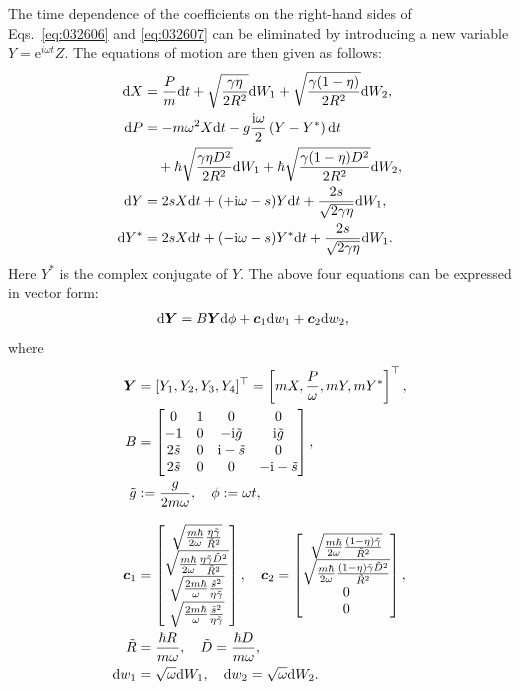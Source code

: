 \documentclass[aps,pra,superscriptaddress,twocolumn
]{revtex4-2}
\newcommand{\e}{\mathrm{e}}
\renewcommand{\i}{\mathrm{i}}
\renewcommand{\d}{{\rm d}}
\begin{document}
 
 The time dependence of the coefficients on the right-hand sides of 
 Eqs.~\eqref{eq:032606} and \eqref{eq:032607} can be eliminated 
 by introducing a new variable $Y=\e^{i\omega t} Z$.
 The equations of motion are then given as follows:
 \begin{alignat}{1}
  \d X &= \frac{P}{m}\d t + \sqrt{\frac{\gamma\eta}{2R^2}}\d W_1 
  + \sqrt{\frac{\gamma(1-\eta)}{2R^2}} \d W_2, \\
  \d P &= - m\omega^2 X\d t -g\frac{\i\omega}{2}\left(Y - Y^*\right) \d t \notag \\
  &\quad + \hbar \sqrt{\frac{\gamma\eta D^2}{2R^2}}\d W_1 
  + \hbar \sqrt{\frac{\gamma(1-\eta)D^2}{2R^2}}\d W_2,  \\
  \d Y &= 2s X \d t + (+\i\omega -s) Y \d t 
  + \frac{2s}{\sqrt{2\gamma\eta}}\d W_1, \\
  \d Y^* &= 2s X \d t + (-\i\omega -s) Y^* \d t 
  + \frac{2s}{\sqrt{2\gamma\eta}}\d W_1.
 \end{alignat}
 Here $Y^*$ is the complex conjugate of $Y$.
 The above four equations can be expressed in vector form:
 \begin{alignat}{1}
  \d \bm Y &= B \bm Y \d \phi + \bm c_1 \d w_1 + \bm c_2 \d w_2, \label{eq011902}
 \end{alignat}
 where
  \begin{alignat}{1}
  \bm Y &= [Y_1,Y_2,Y_3,Y_4]^\top = \left[mX, \frac{P}{\omega}, mY, mY^*\right]^\top,  \\
  B &= \begin{bmatrix}
       0 & 1 & 0 & 0 \\
  -1 & 0 & -\i \tilde g & \i \tilde g \\
       2\tilde s& 0 & \i -\tilde s & 0 \\
       2\tilde s & 0 & 0 & -\i -\tilde s
   \end{bmatrix}, \\
  \tilde g &:= \frac{g}{2m\omega}, \quad 
   \phi := \omega t,\\[3mm]
  \bm c_1 &= 
   \begin{bmatrix}
  \sqrt{\frac{m\hbar}{2\omega} \frac{\eta \tilde\gamma}{\tilde R^2}} \\
  \sqrt{\frac{m\hbar}{2\omega} \frac{\eta \tilde\gamma \tilde D^2}{\tilde R^2}} \\
  \sqrt{\frac{2m\hbar}{\omega} \frac{\tilde s^2}{\eta \tilde\gamma}} \\
  \sqrt{\frac{2m\hbar}{\omega} \frac{\tilde s^2}{\eta \tilde\gamma}} 
   \end{bmatrix},  \quad 
  \bm c_2 = 
   \begin{bmatrix}
  \sqrt{\frac{m\hbar}{2\omega} \frac{(1-\eta) \tilde\gamma}{\tilde R^2}} \\
  \sqrt{\frac{m\hbar}{2\omega} \frac{(1-\eta) \tilde\gamma \tilde D^2}{\tilde R^2}} \\
       0\\ 0
   \end{bmatrix},\\
  \tilde R &= \frac{\hbar R}{m\omega},\quad  \tilde D = \frac{\hbar D}{m\omega},\\
  \d w_1 &= \sqrt{\omega} \d W_1, \quad \d w_2 = \sqrt{\omega} \d W_2.
 \end{alignat}
\end{document}
